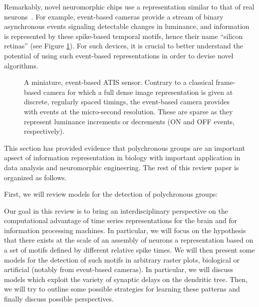 \documentclass[brainsci, %
               review,submit,pdftex,moreauthors%
               ]{Definitions/mdpi}
\begin{document}
Remarkably, novel neuromorphic chips use a representation similar to that of real neurons~\citep{rasetto_challenges_2022}. For example, event-based cameras provide a stream of binary asynchronous events signaling detectable changes in luminance, and information is represented by these spike-based temporal motifs, hence their name ``silicon retinas'' (see Figure \ref{fig:silicon_retina}). For such devices, it is crucial to better understand the potential of using such event-based representations in order to devise novel algorithms.

\begin{figure}
\centering
\caption{A miniature, event-based ATIS sensor. Contrary to a classical frame-based camera for which a full dense image representation is given at discrete, regularly spaced timings, the event-based camera provides with events at the micro-second resolution. These are sparse as they represent luminance increments or decrements (ON and OFF events, respectively).}\label{fig:silicon_retina}
\end{figure}
This section has provided evidence that polychronous groups are an important apsect of information representation in biology with important application in data analysis and neuromorphic engineering. The rest of this review paper is organized as follows.



First, we will review models for the detection of polychronous groups:

Our goal in this review is to bring an interdisciplinary perspective on the computational advantage of time series representations for the brain and for information processing machines. In particular, we will focus on the hypothesis that there exists at the scale of an assembly of neurons a representation based on a set of motifs defined by different relative spike times. %
We will then present some models for the detection of such motifs in arbitrary raster plots, biological or artificial (notably from event-based cameras). In particular, we will discuss models which exploit the variety of synaptic delays on the dendritic tree. Then, we will try to outline some possible strategies for learning these patterns and finally discuss possible perspectives.
\end{document}
